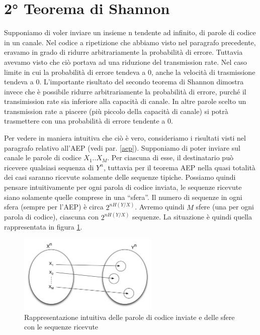 \section{2° Teorema di Shannon}
Supponiamo di voler inviare un insieme n tendente ad infinito, di parole di codice in un canale. Nel codice a ripetizione che abbiamo visto nel paragrafo precedente, eravamo in grado di ridurre arbitrariamente la probabilità di errore. Tuttavia avevamo visto che ciò 
portava ad una riduzione del transmission rate. Nel caso limite in cui la probabilità di errore tendeva a 0, anche la velocità di trasmissione tendeva a 0.
L'importante risultato del secondo teorema di Shannon dimostra invece che è possibile ridurre arbitrariamente la probabilità di errore, 
purché il transimission rate sia inferiore alla capacità di canale. In altre parole scelto un transmission rate a piacere (più piccolo della capacità di canale) si potrà trasmettere con una probabilità di errore tendente a 0.

Per vedere in maniera intuitiva che ciò è vero, consideriamo i risultati visti nel paragrafo relativo all'AEP (vedi par. \ref{aep}).
Supponiamo di poter inviare sul canale le parole di codice $X_1..X_M$. Per ciascuna di esse, il destinatario può ricevere qualsiasi 
sequenza di $Y^n$, tuttavia per il teorema AEP nella quasi totalità dei casi saranno ricevute solamente delle sequenze tipiche.
Possiamo quindi pensare intuitivamente per ogni parola di codice inviata, le sequenze ricevute siano solamente quelle comprese in una 
``sfera''. Il numero di sequenze in ogni sfera (sempre per l'AEP) è circa $2^{n H(Y/X)}$. Avremo quindi $M$ sfere (una per ogni parola di codice), ciascuna con $2^{n H(Y/X)}$ sequenze. La situazione è quindi quella rappresentata in figura \ref{fig:sha2}.

\begin{figure}[htbp]
\begin{center}
	\includegraphics[width=0.6\textwidth]{img/sha2.pdf}
\caption{Rappresentazione intuitiva delle parole di codice inviate e delle sfere con le sequenze ricevute}
\label{fig:sha2}
\end{center}
\end{figure}


